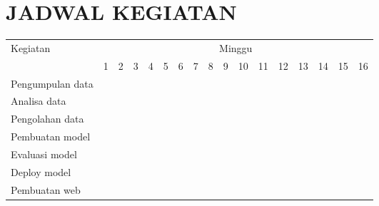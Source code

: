 \chapter*{JADWAL KEGIATAN}
\newcommand{\w}{}
\newcommand{\G}{\cellcolor{gray}}
\begin{table}[h!]
    \begin{tabular}{|p{3.5cm}|c|c|c|c|c|c|c|c|c|c|c|c|c|c|c|c|}

        \hline
        \multirow{2}{*}{Kegiatan} & \multicolumn{16}{|c|}{Minggu}                                                                       \\
        \cline{2-17}              &
        1                         & 2                             & 3  & 4  & 5  & 6  & 7  & 8  & 9  & 10 & 11 & 12 & 13 & 14 & 15 & 16 \\
        \hline

        Pengumpulan data          &
        \G                        & \G                            & \G & \G & \w & \w & \w & \w & \w & \w & \w & \w & \w & \w & \w & \w \\
        \hline

        Analisa data              &
        \w                        & \w                            & \w & \w & \G & \G & \w & \w & \w & \w & \w & \w & \w & \w & \w & \w \\
        \hline

        Pengolahan data           &
        \w                        & \w                            & \w & \w & \w & \G & \G & \w & \w & \w & \w & \w & \w & \w & \w & \w \\
        \hline

        Pembuatan model           &
        \w                        & \w                            & \w & \w & \w & \w & \w & \G & \G & \G & \G & \w & \w & \w & \w & \w \\
        \hline

        Evaluasi model            &
        \w                        & \w                            & \w & \w & \w & \w & \w & \w & \w & \w & \G & \G & \G & \w & \w & \w \\
        \hline

        Deploy model              &
        \w                        & \w                            & \w & \w & \w & \w & \w & \w & \w & \w & \w & \w & \w & \G & \w & \w \\
        \hline

        Pembuatan web             &
        \w                        & \w                            & \w & \w & \w & \w & \w & \w & \w & \w & \w & \w & \w & \w & \G & \G \\
        \hline
    \end{tabular}
\end{table}